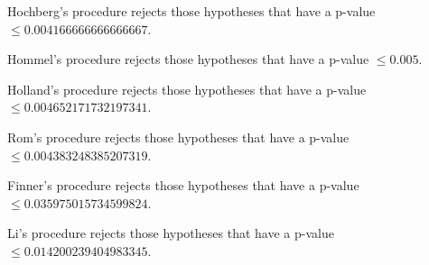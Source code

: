 \documentclass[a4paper,10pt]{article}
\begin{document}
\begin{landscape}
Hochberg's procedure rejects those hypotheses that have a p-value $\le0.004166666666666667$.


Hommel's procedure rejects those hypotheses that have a p-value $\le0.005$.


Holland's procedure rejects those hypotheses that have a p-value $\le0.004652171732197341$.


Rom's procedure rejects those hypotheses that have a p-value $\le0.004383248385207319$.


Finner's procedure rejects those hypotheses that have a p-value $\le0.035975015734599824$.


Li's procedure rejects those hypotheses that have a p-value $\le0.014200239404983345$.



\newpage


\end{landscape}
\end{document}
